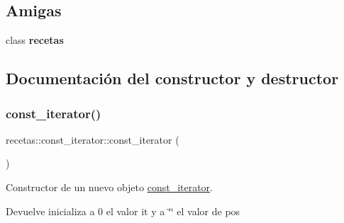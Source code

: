 \subsection*{Amigas}
\begin{DoxyCompactItemize}
\item 
\mbox{\label{classrecetas_1_1const__iterator_a95376bf78fb9fb7122e0a6133eafbffc}} 
class {\bfseries recetas}
\end{DoxyCompactItemize}


\subsection{Documentación del constructor y destructor}
\mbox{\label{classrecetas_1_1const__iterator_aafa502569f7377b27e518f7f057f14b3}} 
\subsubsection{\texorpdfstring{const\+\_\+iterator()}{const\_iterator()}\hspace{0.1cm}{\footnotesize\ttfamily [1/3]}}
{\footnotesize\ttfamily recetas\+::const\+\_\+iterator\+::const\+\_\+iterator (\begin{DoxyParamCaption}{ }\end{DoxyParamCaption})\hspace{0.3cm}{\ttfamily [inline]}}



Constructor de un nuevo objeto \hyperlink{classrecetas_1_1const__iterator}{const\+\_\+iterator}. 

\begin{DoxyReturn}{Devuelve}
inicializa a 0 el valor it y a \char`\"{}\char`\"{} el valor de pos 
\end{DoxyReturn}
\mbox{\label{classrecetas_1_1const__iterator_a8dce57b1b2de5ec94412fc25f95efe44}} 
